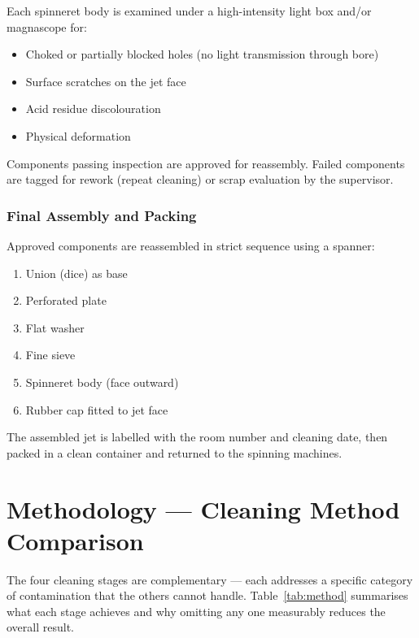 \documentclass{book}
\begin{document}
Each spinneret body is examined under a high-intensity light box and/or magnascope for:
\begin{itemize}[leftmargin=1.5em]
  \item Choked or partially blocked holes (no light transmission through bore)
  \item Surface scratches on the jet face
  \item Acid residue discolouration
  \item Physical deformation
\end{itemize}
Components passing inspection are approved for reassembly. Failed components are tagged for rework (repeat cleaning) or scrap evaluation by the supervisor.

\subsection{Final Assembly and Packing}

Approved components are reassembled in strict sequence using a spanner:
\begin{enumerate}[leftmargin=1.5em]
  \item Union (dice) as base
  \item Perforated plate
  \item Flat washer
  \item Fine sieve
  \item Spinneret body (face outward)
  \item Rubber cap fitted to jet face
\end{enumerate}
The assembled jet is labelled with the room number and cleaning date, then packed in a clean container and returned to the spinning machines.

\chapter{Methodology --- Cleaning Method Comparison}

The four cleaning stages are complementary --- each addresses a specific category of contamination that the others cannot handle. Table~\ref{tab:method} summarises what each stage achieves and why omitting any one measurably reduces the overall result.
\end{document}
